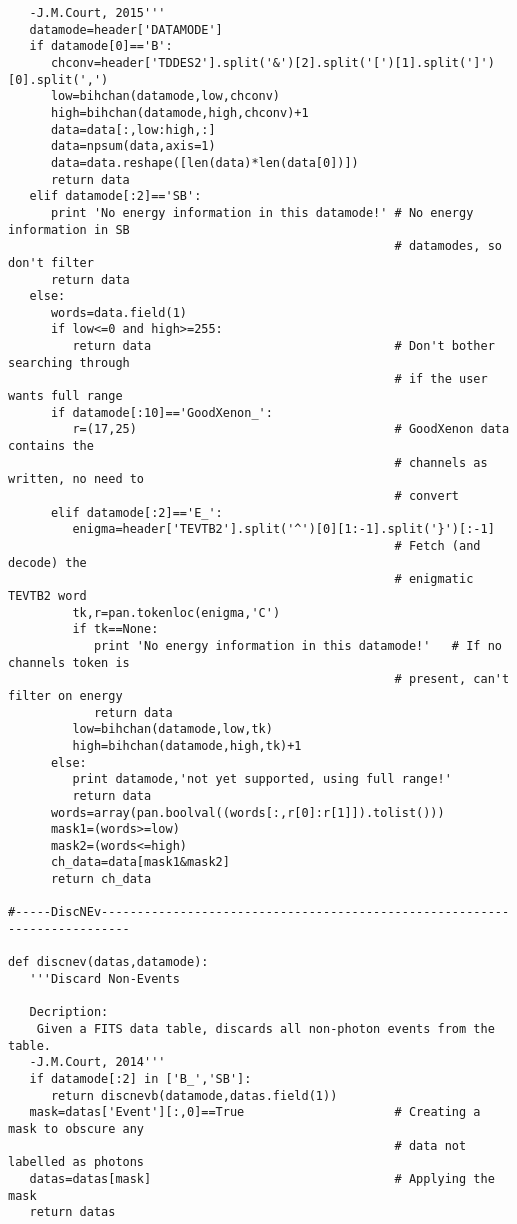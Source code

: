 \begin{verbatim}
   -J.M.Court, 2015'''
   datamode=header['DATAMODE']
   if datamode[0]=='B':
      chconv=header['TDDES2'].split('&')[2].split('[')[1].split(']')[0].split(',')
      low=bihchan(datamode,low,chconv)
      high=bihchan(datamode,high,chconv)+1
      data=data[:,low:high,:]
      data=npsum(data,axis=1)
      data=data.reshape([len(data)*len(data[0])])
      return data
   elif datamode[:2]=='SB':
      print 'No energy information in this datamode!' # No energy information in SB
                                                      # datamodes, so don't filter
      return data
   else:
      words=data.field(1)
      if low<=0 and high>=255:
         return data                                  # Don't bother searching through
                                                      # if the user wants full range
      if datamode[:10]=='GoodXenon_':
         r=(17,25)                                    # GoodXenon data contains the
                                                      # channels as written, no need to
                                                      # convert
      elif datamode[:2]=='E_':
         enigma=header['TEVTB2'].split('^')[0][1:-1].split('}')[:-1]
                                                      # Fetch (and decode) the
                                                      # enigmatic TEVTB2 word
         tk,r=pan.tokenloc(enigma,'C')
         if tk==None:
            print 'No energy information in this datamode!'   # If no channels token is
                                                      # present, can't filter on energy
            return data
         low=bihchan(datamode,low,tk)
         high=bihchan(datamode,high,tk)+1
      else:
         print datamode,'not yet supported, using full range!'
         return data
      words=array(pan.boolval((words[:,r[0]:r[1]]).tolist()))
      mask1=(words>=low)
      mask2=(words<=high)
      ch_data=data[mask1&mask2]
      return ch_data

#-----DiscNEv--------------------------------------------------------------------------

def discnev(datas,datamode):
   '''Discard Non-Events
   
   Decription:
    Given a FITS data table, discards all non-photon events from the table.
   -J.M.Court, 2014'''
   if datamode[:2] in ['B_','SB']:
      return discnevb(datamode,datas.field(1))
   mask=datas['Event'][:,0]==True                     # Creating a mask to obscure any
                                                      # data not labelled as photons
   datas=datas[mask]                                  # Applying the mask
   return datas


\end{verbatim}
